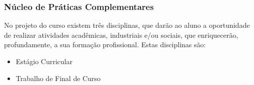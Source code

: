 \subsubsection{Núcleo de Práticas Complementares}
No projeto do curso existem três disciplinas, que darão ao aluno a oportunidade de realizar atividades acadêmicas, industriais e/ou sociais, que enriquecerão, profundamente, a sua formação profissional. Estas disciplinas são:

\begin{itemize}
\item Estágio Curricular
\item Trabalho de Final de Curso
\end{itemize}
